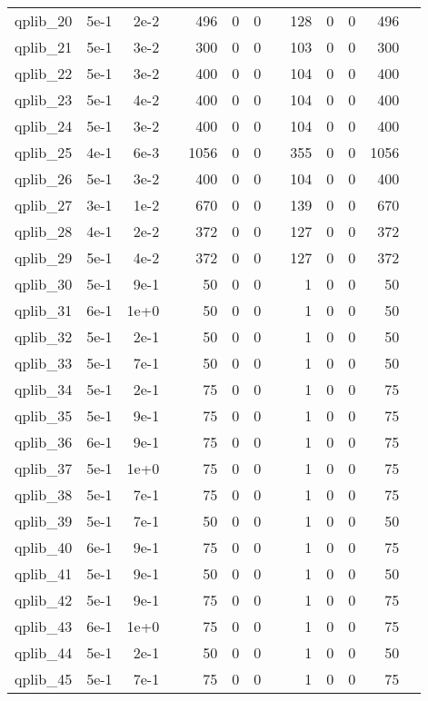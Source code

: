 \begin{table}
\begin{tabular}{lrrrrrrrrrrrr}
qplib\_20	&	5e-1	&	2e-2	&	&	496	&	0	&	0	&	&	128	&	0	&	0	&	496	\\
qplib\_21	&	5e-1	&	3e-2	&	&	300	&	0	&	0	&	&	103	&	0	&	0	&	300	\\
qplib\_22	&	5e-1	&	3e-2	&	&	400	&	0	&	0	&	&	104	&	0	&	0	&	400	\\
qplib\_23	&	5e-1	&	4e-2	&	&	400	&	0	&	0	&	&	104	&	0	&	0	&	400	\\
qplib\_24	&	5e-1	&	3e-2	&	&	400	&	0	&	0	&	&	104	&	0	&	0	&	400	\\
qplib\_25	&	4e-1	&	6e-3	&	&	1056	&	0	&	0	&	&	355	&	0	&	0	&	1056	\\
qplib\_26	&	5e-1	&	3e-2	&	&	400	&	0	&	0	&	&	104	&	0	&	0	&	400	\\
qplib\_27	&	3e-1	&	1e-2	&	&	670	&	0	&	0	&	&	139	&	0	&	0	&	670	\\
qplib\_28	&	4e-1	&	2e-2	&	&	372	&	0	&	0	&	&	127	&	0	&	0	&	372	\\
qplib\_29	&	5e-1	&	4e-2	&	&	372	&	0	&	0	&	&	127	&	0	&	0	&	372	\\
qplib\_30	&	5e-1	&	9e-1	&	&	50	&	0	&	0	&	&	1	&	0	&	0	&	50	\\
qplib\_31	&	6e-1	&	1e+0	&	&	50	&	0	&	0	&	&	1	&	0	&	0	&	50	\\
qplib\_32	&	5e-1	&	2e-1	&	&	50	&	0	&	0	&	&	1	&	0	&	0	&	50	\\
qplib\_33	&	5e-1	&	7e-1	&	&	50	&	0	&	0	&	&	1	&	0	&	0	&	50	\\
qplib\_34	&	5e-1	&	2e-1	&	&	75	&	0	&	0	&	&	1	&	0	&	0	&	75	\\
qplib\_35	&	5e-1	&	9e-1	&	&	75	&	0	&	0	&	&	1	&	0	&	0	&	75	\\
qplib\_36	&	6e-1	&	9e-1	&	&	75	&	0	&	0	&	&	1	&	0	&	0	&	75	\\
qplib\_37	&	5e-1	&	1e+0	&	&	75	&	0	&	0	&	&	1	&	0	&	0	&	75	\\
qplib\_38	&	5e-1	&	7e-1	&	&	75	&	0	&	0	&	&	1	&	0	&	0	&	75	\\
qplib\_39	&	5e-1	&	7e-1	&	&	50	&	0	&	0	&	&	1	&	0	&	0	&	50	\\
qplib\_40	&	6e-1	&	9e-1	&	&	75	&	0	&	0	&	&	1	&	0	&	0	&	75	\\
qplib\_41	&	5e-1	&	9e-1	&	&	50	&	0	&	0	&	&	1	&	0	&	0	&	50	\\
qplib\_42	&	5e-1	&	9e-1	&	&	75	&	0	&	0	&	&	1	&	0	&	0	&	75	\\
qplib\_43	&	6e-1	&	1e+0	&	&	75	&	0	&	0	&	&	1	&	0	&	0	&	75	\\
qplib\_44	&	5e-1	&	2e-1	&	&	50	&	0	&	0	&	&	1	&	0	&	0	&	50	\\
qplib\_45	&	5e-1	&	7e-1	&	&	75	&	0	&	0	&	&	1	&	0	&	0	&	75	\\

\end{tabular}
\end{table}
